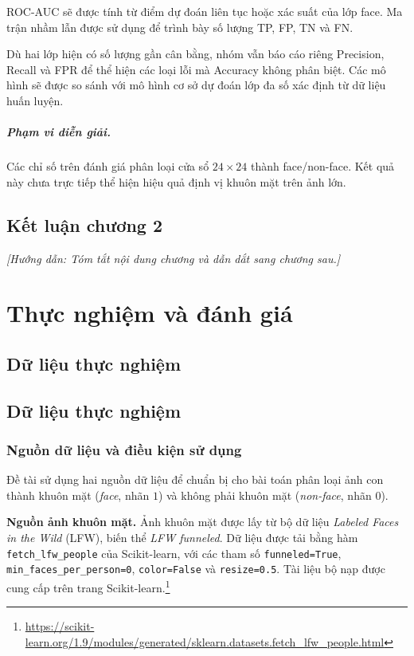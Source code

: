 \documentclass[12pt,a4paper,oneside]{report}
\newcommand{\huongdan}[1]{{\color{guide}\itshape [Hướng dẫn: #1]}}
\begin{document}
ROC-AUC sẽ được tính từ điểm dự đoán liên tục
hoặc xác suất của lớp face.
Ma trận nhầm lẫn được sử dụng để trình bày
số lượng TP, FP, TN và FN.

Dù hai lớp hiện có số lượng gần cân bằng,
nhóm vẫn báo cáo riêng Precision, Recall và FPR
để thể hiện các loại lỗi mà Accuracy không phân biệt.
Các mô hình sẽ được so sánh với mô hình cơ sở
dự đoán lớp đa số xác định từ dữ liệu huấn luyện.

\paragraph{Phạm vi diễn giải.}

Các chỉ số trên đánh giá phân loại cửa sổ
$24 \times 24$ thành face/non-face.
Kết quả này chưa trực tiếp thể hiện hiệu quả
định vị khuôn mặt trên ảnh lớn.

\section{Kết luận chương 2}
\huongdan{Tóm tắt nội dung chương và dẫn dắt sang chương sau.}

\chapter{Thực nghiệm và đánh giá}
\label{chap:thucnghiem}

\section{Dữ liệu thực nghiệm}
\section{Dữ liệu thực nghiệm}

\subsection*{Nguồn dữ liệu và điều kiện sử dụng}

Đề tài sử dụng hai nguồn dữ liệu để chuẩn bị cho bài toán
phân loại ảnh con thành khuôn mặt
(\textit{face}, nhãn $1$) và không phải khuôn mặt
(\textit{non-face}, nhãn $0$).

\textbf{Nguồn ảnh khuôn mặt.}
Ảnh khuôn mặt được lấy từ bộ dữ liệu
\textit{Labeled Faces in the Wild} (LFW), biến thể
\textit{LFW funneled}.
Dữ liệu được tải bằng hàm
\texttt{fetch\_lfw\_people} của Scikit-learn,
với các tham số
\texttt{funneled=True},
\texttt{min\_faces\_per\_person=0},
\texttt{color=False} và \texttt{resize=0.5}.
Tài liệu bộ nạp được cung cấp trên trang
Scikit-learn.\footnote{
\url{https://scikit-learn.org/1.9/modules/generated/sklearn.datasets.fetch_lfw_people.html}
}
\end{document}
